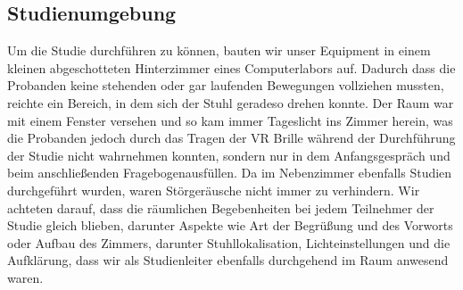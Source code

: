 \subsection{Studienumgebung}
Um die Studie durchführen zu können, bauten wir unser Equipment in einem kleinen abgeschotteten Hinterzimmer eines Computerlabors auf. Dadurch dass die Probanden keine stehenden oder gar laufenden Bewegungen vollziehen mussten, reichte ein Bereich, in dem sich der Stuhl geradeso drehen konnte. Der Raum war mit einem Fenster versehen und so kam immer Tageslicht ins Zimmer herein, was die Probanden jedoch durch das Tragen der VR Brille während der Durchführung der Studie nicht wahrnehmen konnten, sondern nur in dem Anfangsgespräch und beim anschließenden Fragebogenausfüllen. Da im Nebenzimmer ebenfalls Studien durchgeführt wurden, waren Störgeräusche nicht immer zu verhindern. Wir achteten darauf, dass die räumlichen Begebenheiten bei jedem Teilnehmer der Studie gleich blieben, darunter Aspekte wie Art der Begrüßung und des Vorworts oder Aufbau des Zimmers, darunter Stuhllokalisation, Lichteinstellungen und die Aufklärung, dass wir als Studienleiter ebenfalls durchgehend im Raum anwesend waren. 

